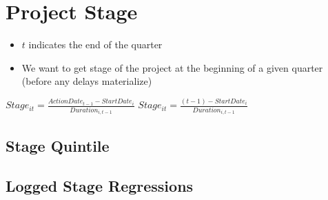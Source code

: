 \documentclass[
]{article}
\providecommand{\tightlist}{%
  \setlength{\itemsep}{0pt}\setlength{\parskip}{0pt}}
\begin{document}
\hypertarget{project-stage}{%
\section{Project Stage}\label{project-stage}}

\begin{itemize}
\tightlist
\item
  \(t\) indicates the end of the quarter
\item
  We want to get stage of the project at the beginning of a given
  quarter (before any delays materialize)
\end{itemize}

\(Stage_{it}=\frac{ActionDate_{t-1}-StartDate_i}{Duration_{i,t-1}}\)
\(Stage_{it}=\frac{(t-1)-StartDate_i}{Duration_{i,t-1}}\)

\hypertarget{stage-quintile}{%
\subsection{Stage Quintile}\label{stage-quintile}}

\hypertarget{logged-stage-regressions}{%
\subsection{Logged Stage Regressions}\label{logged-stage-regressions}}
\end{document}
